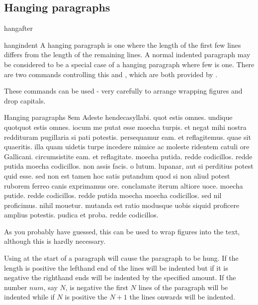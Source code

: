 \subsection{Hanging paragraphs}
 
 \begin{docCommand}{hangafter}{}
\begin{docCommand}{hangindent}{}
A hanging paragraph is one where the length of the first few lines differs from the length
of the remaining lines. A normal indented paragraph may be considered to be a special case of a hanging paragraph where few is one. There are two commands controlling this  and , which are both provided by \tex.
\end{docCommand}
\end{docCommand}


These commands can be used - very carefully to arrange wrapping figures
and drop capitals. 

\begin{texexample}{Hanging paragraphs}{}
\hangindent 8em    \footnotesize
Adeste hendecasyllabi. quot estis 
omnes. undique quotquot estis omnes. 
iocum me putat esse moecha turpis. 
et negat mihi nostra reddituram 
pugillaria si pati potestis. 
persequamur eam. et reflagitemus. 
quae sit quaeritis. illa quam uidetis 
turpe incedere mimice ac moleste 
ridentem catuli ore Gallicani. 
circumsistite eam. et reflagitate. 
moecha putida. redde codicillos. 
redde putida moecha codicillos. 
non assis facis. o lutum. lupanar, 
aut si perditius potest quid esse. 
sed non est tamen hoc satis putandum 
quod si non aliud potest ruborem 
ferreo canis exprimamus ore. 
conclamate iterum altiore uoce. 
moecha putide. redde codicillos. 
redde putida moecha moecha codicillos. 
sed nil proficimus. nihil mouetur. 
mutanda est ratio modusque uobis 
siquid proficere amplius potestis. 
pudica et proba. redde codicillos.

\end{texexample}


As you probably have guessed, this can be used to wrap figures into the text, although this is hardly necessary. 

Using  at the start of a paragraph will cause the paragraph to be hung.
If the length  is positive the lefthand end of the lines will be indented but
if it is negative the righthand ends will be indented by the specified amount. If the
number $num$, say $N$, is negative the first $N$ lines of the paragraph will be indented while
if $N$ is positive the $N+1$ the lines onwards will be indented. 

